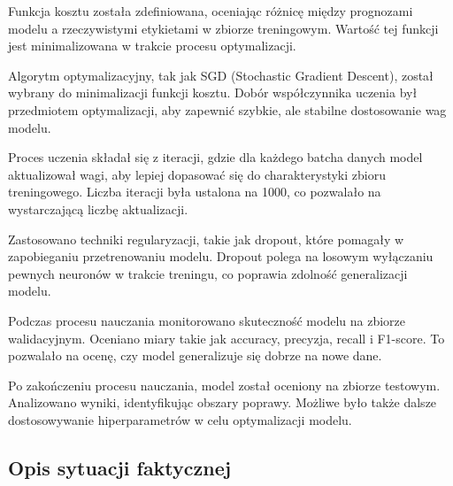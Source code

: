 \documentclass[12pt, a4paper, twoside, openany]{book}
\begin{document}
Funkcja kosztu została zdefiniowana, oceniając różnicę między prognozami modelu a rzeczywistymi etykietami w zbiorze treningowym.
Wartość tej funkcji jest minimalizowana w trakcie procesu optymalizacji.

Algorytm optymalizacyjny, tak jak SGD (Stochastic Gradient Descent), został wybrany do minimalizacji funkcji kosztu.
Dobór współczynnika uczenia był przedmiotem optymalizacji, aby zapewnić szybkie, ale stabilne dostosowanie wag modelu.

Proces uczenia składał się z iteracji, gdzie dla każdego batcha danych model aktualizował wagi, aby lepiej dopasować się do charakterystyki zbioru treningowego.
Liczba iteracji była ustalona na 1000, co pozwalało na wystarczającą liczbę aktualizacji.

Zastosowano techniki regularyzacji, takie jak dropout, które pomagały w zapobieganiu przetrenowaniu modelu.
Dropout polega na losowym wyłączaniu pewnych neuronów w trakcie treningu, co poprawia zdolność generalizacji modelu.

Podczas procesu nauczania monitorowano skuteczność modelu na zbiorze walidacyjnym.
Oceniano miary takie jak accuracy, precyzja, recall i F1-score.
To pozwalało na ocenę, czy model generalizuje się dobrze na nowe dane.

Po zakończeniu procesu nauczania, model został oceniony na zbiorze testowym. Analizowano wyniki, identyfikując obszary poprawy.
Możliwe było także dalsze dostosowywanie hiperparametrów w celu optymalizacji modelu.
\subsection{Opis sytuacji faktycznej}
\end{document}
